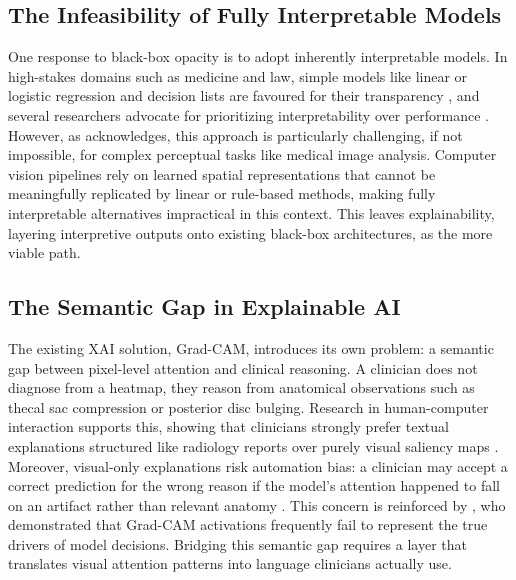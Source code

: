 \documentclass[12pt]{article}
\begin{document}
\subsection{The Infeasibility of Fully Interpretable Models}
One response to black-box opacity is to adopt inherently interpretable models. In high-stakes domains such as medicine and law, simple models like linear or logistic regression and decision lists are favoured for their transparency \citep{wang2019hybridpredictivemodelinterpretable}, and several researchers advocate for prioritizing interpretability over performance \citep{rudin2019stopexplainingblackbox}. However, as \cite{rudin2019stopexplainingblackbox} acknowledges, this approach is particularly challenging, if not impossible, for complex perceptual tasks like medical image analysis. Computer vision pipelines rely on learned spatial representations that cannot be meaningfully replicated by linear or rule-based methods, making fully interpretable alternatives impractical in this context. This leaves explainability, layering interpretive outputs onto existing black-box architectures, as the more viable path.

\subsection{The Semantic Gap in Explainable AI}
The existing XAI solution, Grad-CAM, introduces its own problem: a semantic gap between pixel-level attention and clinical reasoning. A clinician does not diagnose from a heatmap, they reason from anatomical observations such as thecal sac compression or posterior disc bulging. Research in human-computer interaction supports this, showing that clinicians strongly prefer textual explanations structured like radiology reports over purely visual saliency maps \citep{gale2018producingradiologistqualityreportsinterpretable, kayser2024fooloncecontrastingtextual}. Moreover, visual-only explanations risk automation bias: a clinician may accept a correct prediction for the wrong reason if the model’s attention happened to fall on an artifact rather than relevant anatomy \citep{Houssein2025}. This concern is reinforced by \cite{panboonyuen2026seeingisntbelievinganalysis}, who demonstrated that Grad-CAM activations frequently fail to represent the true drivers of model decisions. Bridging this semantic gap requires a layer that translates visual attention patterns into language clinicians actually use.
\end{document}
